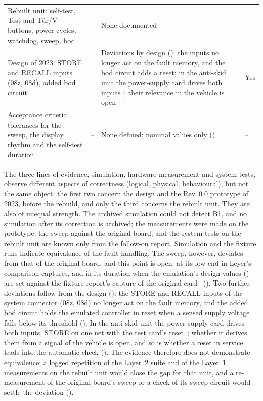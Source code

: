 \begin{table}[htbp]
\begin{tabular}{@{}>{\raggedright\arraybackslash}p{} >{\raggedright\arraybackslash}p{} >{\raggedright\arraybackslash}p{} >{\raggedright\arraybackslash}p{}@{}}
		Rebuilt unit: self-test, Test and Tür/V buttons, power cycles, watchdog, sweep, \gls{bod} & -- & None documented & -- \\
		Design of 2023: STORE and RECALL inputs (08z, 08d), added \gls{bod} circuit & 2023 & Deviations by design (\Cref{sec:en50716_modifications}): the inputs no longer act on the fault memory, and the \gls{bod} circuit adds a reset; in the anti-skid unit the power-supply card drives both inputs~\cite{backplane2010}; their relevance in the vehicle is open & Yes \\
		Acceptance criteria: tolerances for the sweep, the display rhythm and the self-test duration & -- & None defined; nominal values only (\Cref{subsec:requirement_basis}) & -- \\
		\bottomrule
	\end{tabular}
\end{table}

The three lines of evidence, simulation, hardware measurement and system tests, observe different aspects of correctness (logical, physical, behavioural), but not the same object: the first two concern the design and the Rev~0.0 prototype of 2023, before the rebuild, and only the third concerns the rebuilt unit. They are also of unequal strength. The archived simulation could not detect B1, and no simulation after its correction is archived; the measurements were made on the prototype, the sweep against the original board; and the system tests on the rebuilt unit are known only from the follow-on report. Simulation and the fixture runs indicate equivalence of the fault handling. The sweep, however, deviates from that of the original board, and this point is open: at its low end in Leyer's comparison captures, and in its duration when the emulation's design values () are set against the fixture report's capture of the original card~\cite[Sec.~5.2, Fig.~3]{dolata2023} (). Two further deviations follow from the design (): the STORE and RECALL inputs of the system connector (08z, 08d) no longer act on the fault memory, and the added \gls{bod} circuit holds the emulated controller in reset when a sensed supply voltage falls below its threshold (). In the anti-skid unit the power-supply card drives both inputs, STORE on one net with the test card's reset~\cite{backplane2010}; whether it derives them from a signal of the vehicle is open, and so is whether a reset in service leads into the automatic check (). The evidence therefore does not demonstrate equivalence: a logged repetition of the Layer~2 suite and of the Layer~1 measurements on the rebuilt unit would close the gap for that unit, and a re-measurement of the original board's sweep or a check of its sweep circuit would settle the deviation ().


